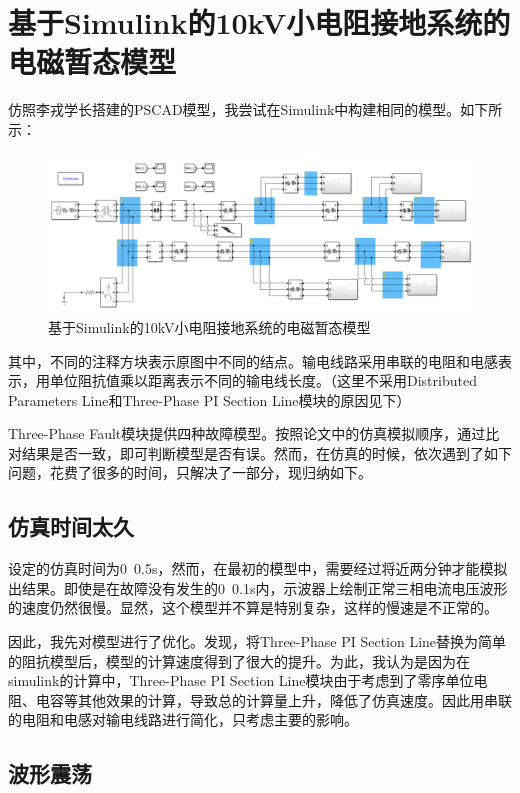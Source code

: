 \documentclass{article}
\begin{document}
{	\section{基于Simulink的10kV小电阻接地系统的电磁暂态模型}
	
	仿照李戎学长搭建的PSCAD模型，我尝试在Simulink中构建相同的模型。如下所示：
	
	\begin{figure}[htpb]
		\centering
		\includegraphics[width=13cm]{figure/1.png}
		\caption{基于Simulink的10kV小电阻接地系统的电磁暂态模型}
	\end{figure}

	其中，不同的注释方块表示原图中不同的结点。输电线路采用串联的电阻和电感表示，用单位阻抗值乘以距离表示不同的输电线长度。（这里不采用Distributed Parameters Line和Three-Phase PI Section Line模块的原因见下）
	
	Three-Phase Fault模块提供四种故障模型。按照论文中的仿真模拟顺序，通过比对结果是否一致，即可判断模型是否有误。然而，在仿真的时候，依次遇到了如下问题，花费了很多的时间，只解决了一部分，现归纳如下。
	
	\subsection{仿真时间太久}
	
	设定的仿真时间为0~0.5s，然而，在最初的模型中，需要经过将近两分钟才能模拟出结果。即使是在故障没有发生的0~0.1s内，示波器上绘制正常三相电流电压波形的速度仍然很慢。显然，这个模型并不算是特别复杂，这样的慢速是不正常的。
	
	因此，我先对模型进行了优化。发现，将Three-Phase PI Section Line替换为简单的阻抗模型后，模型的计算速度得到了很大的提升。为此，我认为是因为在simulink的计算中，Three-Phase PI Section Line模块由于考虑到了零序单位电阻、电容等其他效果的计算，导致总的计算量上升，降低了仿真速度。因此用串联的电阻和电感对输电线路进行简化，只考虑主要的影响。
	
	\subsection{波形震荡}
	
}
\end{document}
